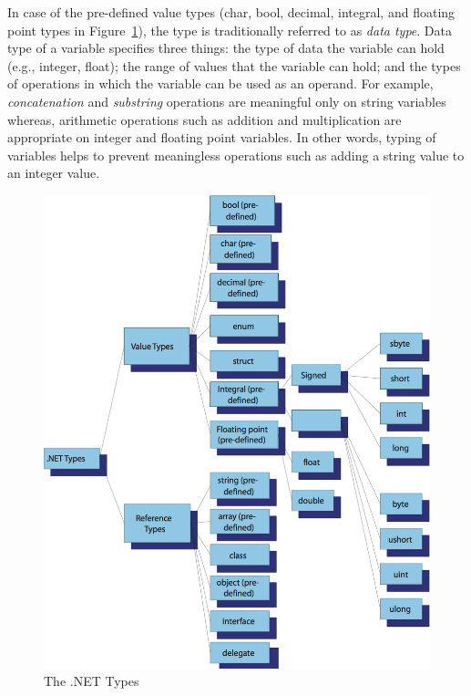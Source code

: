In case of the pre-defined value types (char, bool, decimal,
integral, and floating point types in Figure~\ref{fig:TypeTree}),
the type is traditionally referred to as \emph{data type}. Data
type of a variable specifies three things: the type of data the
variable can hold (e.g., integer, float); the range of values that
the variable can hold; and the types of operations in which the
variable can be used as an operand. For example,
\emph{concatenation} and \emph{substring} operations are
meaningful only on string variables whereas, arithmetic operations
such as addition and multiplication are appropriate on integer and
floating point variables. In other words, typing of variables
helps to prevent meaningless operations such as adding a string
value to an integer value.


\begin{figure}
\centering
\includegraphics[scale=0.5]{./CSharpBasics/Illus/TypeTree}
\caption{The .NET Types} \label{fig:TypeTree}
\end{figure}


